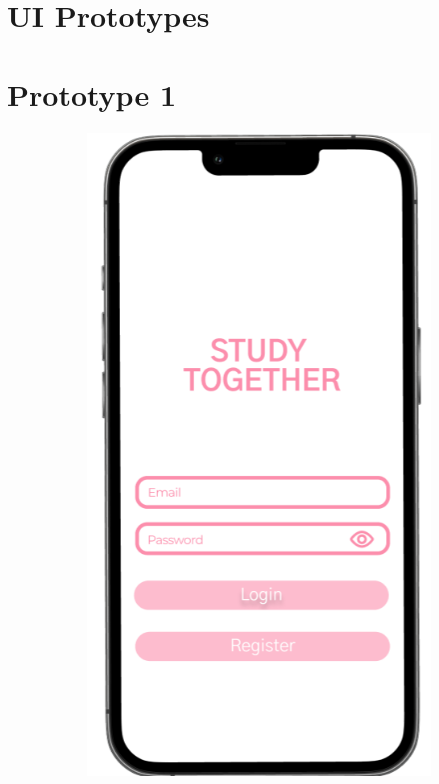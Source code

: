 \section{UI Prototypes}\label{ch:ui_prototypes}

\section{Prototype 1}

\begin{figure}[h]
  \centering
  \begin{subfigure}[b]{0.3\textwidth} %
    \includegraphics[width=\textwidth]{Figures/landing.png}

\end{subfigure}
\end{figure}
